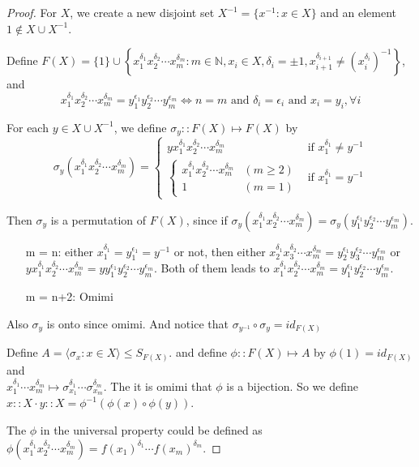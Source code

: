 \begin{proof}
  For $X$, we create a new disjoint set $X^{-1} = \{ x^{-1} : x \in X\}$ 
  and an element $1 \notin X \cup X^{-1}$.

  Define $F(X) = \{ 1 \} \cup \left\{ x_1^{\delta_1} x_2^{\delta_2} \cdots x_m^{\delta_m} : 
   m \in \mathbb{N} , x_i \in X, \delta_i = \pm 1, x_{i+1}^{\delta_{i+1}} \neq 
   \left( x_i^{\delta_i} \right)^{-1}\right\}$, and 
  \[ x_1^{\delta_1} x_2^{\delta_2} \cdots x_m^{\delta_m} = 
    y_1^{\epsilon_1} y_2^{\epsilon_2} \cdots y_m^{\epsilon_m}  \iff n = m \text{ and }
    \delta_i = \epsilon_i \text{ and } x_i = y_i , \forall i \]

  For each $y \in X \cup X^{-1}$, we define $\sigma_y :: F(X) \mapsto F(X)$ by 
  \[
    \sigma_y (x_1^{\delta_1} x_2^{\delta_2} \cdots x_m^{\delta_m}) 
    = 
    \begin{cases}
      y x_1^{\delta_1} x_2^{\delta_2} \cdots x_m^{\delta_m} & \text{if } x_1^{\delta_1} \neq y^{-1} \\
      \begin{cases}
        x_1^{\delta_1} x_2^{\delta_2} \cdots x_m^{\delta_m} & (m \geq 2) \\
        1 & (m = 1)
      \end{cases} & \text{if } x_1^{\delta_1} = y^{-1}
    \end{cases}
  \]

  Then $\sigma_y$ is a permutation of $F(X)$, since if 
  $ \sigma_y(x_1^{\delta_1} x_2^{\delta_2} \cdots x_m^{\delta_m}) = 
  \sigma_y(y_1^{\epsilon_1} y_2^{\epsilon_2} \cdots y_m^{\epsilon_m}) $.
  \begin{itemize}
    \item[m = n:] either $x_1^{\delta_1} = y_1^{\epsilon_1} = y^{-1}$ or not, 
      then either $x_2^{\delta_1} x_3^{\delta_2} \cdots x_m^{\delta_m} = 
  y_2^{\epsilon_1} y_3^{\epsilon_2} \cdots y_m^{\epsilon_m}$ or 
  $y x_1^{\delta_1} x_2^{\delta_2} \cdots x_m^{\delta_m} = 
  y y_1^{\epsilon_1} y_2^{\epsilon_2} \cdots y_m^{\epsilon_m}$. Both of them leads to 
  $x_1^{\delta_1} x_2^{\delta_2} \cdots x_m^{\delta_m} = 
  y_1^{\epsilon_1} y_2^{\epsilon_2} \cdots y_m^{\epsilon_m}$.
  \item[m = n+2:] Omimi
  \end{itemize}
  Also $\sigma_y$ is onto since omimi. And notice that $\sigma_{y^{-1}} \circ \sigma_y = id_{F(X)}$

  Define $A = \langle \sigma_x : x \in X \rangle \leq S_{F(X)}$. and define $\phi:: F(X) \mapsto A$ by
  $\phi(1) = id_{F(X)}$ and \\ $x_1^{\delta_1} \cdots x_m^{\delta_m} \mapsto \sigma_{x_1}^{\delta_1}
  \cdots \sigma_{x_m}^{\delta_m}$. The it is omimi that $\phi$ is a bijection. So we define 
  $x::X \cdot y::X = \phi^{-1}( \phi(x) \circ \phi(y) )$.

  The $\phi$  in the universal property could be defined as 
  $\phi(x_1^{\delta_1} x_2^{\delta_2} \cdots x_m^{\delta_m}) = f(x_1)^{\delta_1} \cdots f(x_m)^{\delta_m}$.
\end{proof}

